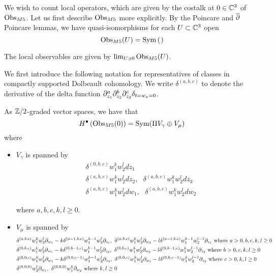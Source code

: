 We wish to count local operators, which are given by the costalk at $0\in \mathbb{C}^{3}$ of ${\rm Obs}_{M5}$. Let us first describe ${\rm Obs}_{M5}$ more explicitly. By the Poincare and $\overline{\partial}$ Poincare lemmas, we have quasi-isomorphisms for each $U\subset \mathbb{C}^{3}$ open
\[
\Obs_{M5}(U) = \Sym \left( \begin{tikzcd}  \end{tikzcd} \right)
\]

The local observables are given by $\lim _{U\ni 0} {\rm Obs}_{M5}(U)$.

We first introduce the following notation for representatives of classes in compactly supported Dolbeault cohomology. We write $\delta^{(a,b,c)}$ to denote the derivative of the delta function $\partial_{z_{1}}^{a}\partial_{z_{2}}^{b}\partial_{z_{3}}^{c}\delta_{t=w_{a}=0}$.

\begin{lem}
  As $\mathbb{Z}/2$-graded vector spaces, we have that \[H^{\bullet}\left ( {\rm Obs}_{M5}(0)\right )=\operatorname{Sym} (\Pi V_{\gamma}\oplus  V_{\mu})\] where
  \begin{itemize}
    \item $V_{\gamma}$ is spanned by
          \begin{align}
            & \delta^{(0,b,c)}w_{1}^{k}w_{2}^{l}dz_{1} \\
            & \delta^{(a,b,c)}w_{1}^{k}w_{2}^{l}dz_{2}, \ \ \
             \delta^{(a,b,c)}w_{1}^{k}w_{2}^{l}dz_{3} \\
            & \delta^{(a,b,c)}w_{1}^{k}w_{2}^{l}dw_{1}, \ \ \
            \delta^{(a,b,c)}w_{1}^{k}w_{2}^{l}dw_{2}
          \end{align}

          where $a, b, c, k, l \geq 0$.
    \item $V_{\mu}$ is spanned by
          \begin{align}
            & \delta^{(a,b,c)}w_{1}^{k}w_{2}^{l}\del_{w_1}-k\delta^{(a-1,b, c)}w_{1}^{k-1}w_{2}^{l}\del_{z_{1}},\
             \delta^{(a,b,c)}w_{1}^{k}w_{2}^{l}\del_{w_2}-l\delta^{(a-1,b, c)}w_{1}^{k-1}w_{2}^{l-1}\del_{z_{1}}\text{ where }a > 0, b,c,k,l \geq 0 \\
            & \delta^{(0,b,c)}w_{1}^{k}w_{2}^{l}\del_{w_1}-k\delta^{(0,b-1,c)}w_{1}^{k-1}w_{2}^{l}\del_{z_{2}}, \ \delta^{(0,b,c)}w_{1}^{k}w_{2}^{l}\del_{w_2}-l\delta^{(0,b-1,c)}w_{1}^{k}w_{2}^{l-1}\del_{z_{2}}\text{ where }b > 0,c,k,l \geq 0 \\
            & \delta^{(0,0,c)}w_{1}^{k}w_{2}^{l}\del_{w_1}-k\delta^{(0,0,c-1)}w_{1}^{k-1}w_{2}^{l}\del_{z_{3}}, \ \delta^{(0,0,c)}w_{1}^{k}w_{2}^{l}\del_{w_1}-l\delta^{(0,0,c-1)}w_{1}^{k}w_{2}^{l-1}\del_{z_{3}}\text{ where } c > 0,k,l \geq 0 \\
            & \delta^{(0,0,0)}w_{2}^{l}\del_{w_1}, \ \delta^{(0,0,0)}w_{1}^{k}\del_{w_2}\text{ where }k,l \geq 0
          \end{align}
  \end{itemize}
\end{lem}

